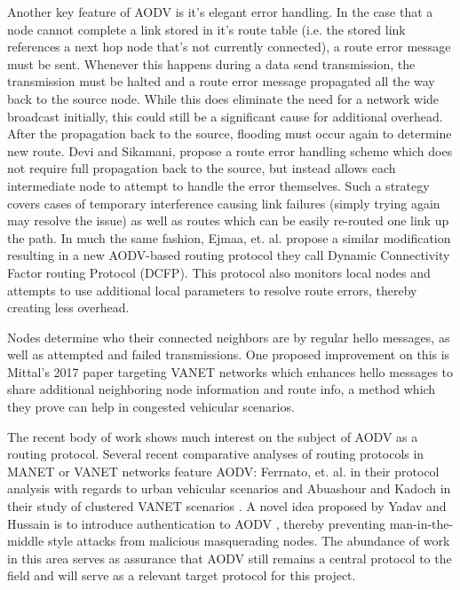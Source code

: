 \documentclass[conference]{IEEEtran}
\begin{document}
Another key feature of AODV is it's elegant error handling. In the case that a node cannot complete a link stored in it's route table (i.e. the stored link references a next hop node that's not currently connected), a route error message must be sent. Whenever this happens during a data send transmission, the transmission must be halted and a route error message propagated all the way back to the source node. While this does eliminate the need for a network wide broadcast initially, this could still be a significant cause for additional overhead. After the propagation back to the source, flooding must occur again to determine new route. Devi and Sikamani, \cite{6675942} propose a route error handling scheme which does not require full propagation back to the source, but instead allows each intermediate node to attempt to handle the error themselves. Such a strategy covers cases of temporary interference causing link failures (simply trying again may resolve the issue) as well as routes which can be easily re-routed one link up the path. In much the same fashion, Ejmaa, et. al. \cite{aodv_interest_overhead} propose a similar modification resulting in a new AODV-based routing protocol they call Dynamic Connectivity Factor routing Protocol (DCFP). This protocol also monitors local nodes and attempts to use additional local parameters to resolve route errors, thereby creating less overhead.

Nodes determine who their connected neighbors are by regular hello messages, as well as attempted and failed transmissions. One proposed improvement on this is Mittal's 2017 paper \cite{8344719} targeting VANET networks which enhances hello messages to share additional neighboring node information and route info, a method which they prove can help in congested vehicular scenarios.

The recent body of work shows much interest on the subject of AODV as a routing protocol. Several recent comparative analyses of routing protocols in MANET or VANET networks feature AODV: Ferrnato, et. al. in their protocol analysis with regards to urban vehicular scenarios \cite{aodv_interest_urban} and Abuashour and Kadoch in their study of clustered VANET scenarios \cite{aodv_interest_vanet}. A novel idea proposed by Yadav and Hussain is to introduce authentication to AODV \cite{8203733}, thereby preventing man-in-the-middle style attacks from malicious masquerading nodes. The abundance of work in this area serves as assurance that AODV still remains a central protocol to the field and will serve as a relevant target protocol for this project.
\end{document}
